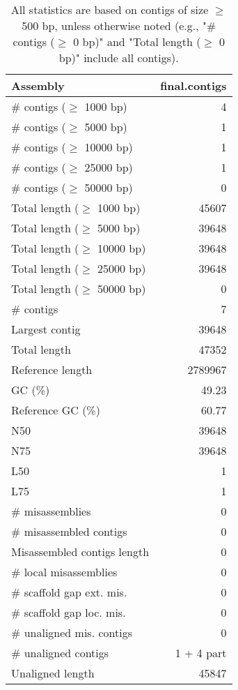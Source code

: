 \documentclass[12pt,a4paper]{article}
\begin{document}
\begin{table}[ht]
\begin{center}
\caption{All statistics are based on contigs of size $\geq$ 500 bp, unless otherwise noted (e.g., "\# contigs ($\geq$ 0 bp)" and "Total length ($\geq$ 0 bp)" include all contigs).}
\begin{tabular}{|l*{1}{|r}|}
\hline
Assembly & final.contigs \\ \hline
\# contigs ($\geq$ 1000 bp) & 4 \\ \hline
\# contigs ($\geq$ 5000 bp) & 1 \\ \hline
\# contigs ($\geq$ 10000 bp) & 1 \\ \hline
\# contigs ($\geq$ 25000 bp) & 1 \\ \hline
\# contigs ($\geq$ 50000 bp) & 0 \\ \hline
Total length ($\geq$ 1000 bp) & 45607 \\ \hline
Total length ($\geq$ 5000 bp) & 39648 \\ \hline
Total length ($\geq$ 10000 bp) & 39648 \\ \hline
Total length ($\geq$ 25000 bp) & 39648 \\ \hline
Total length ($\geq$ 50000 bp) & 0 \\ \hline
\# contigs & 7 \\ \hline
Largest contig & 39648 \\ \hline
Total length & 47352 \\ \hline
Reference length & 2789967 \\ \hline
GC (\%) & 49.23 \\ \hline
Reference GC (\%) & 60.77 \\ \hline
N50 & 39648 \\ \hline
N75 & 39648 \\ \hline
L50 & 1 \\ \hline
L75 & 1 \\ \hline
\# misassemblies & 0 \\ \hline
\# misassembled contigs & 0 \\ \hline
Misassembled contigs length & 0 \\ \hline
\# local misassemblies & 0 \\ \hline
\# scaffold gap ext. mis. & 0 \\ \hline
\# scaffold gap loc. mis. & 0 \\ \hline
\# unaligned mis. contigs & 0 \\ \hline
\# unaligned contigs & 1 + 4 part \\ \hline
Unaligned length & 45847 \\ \hline

\end{tabular}
\end{center}
\end{table}
\end{document}
